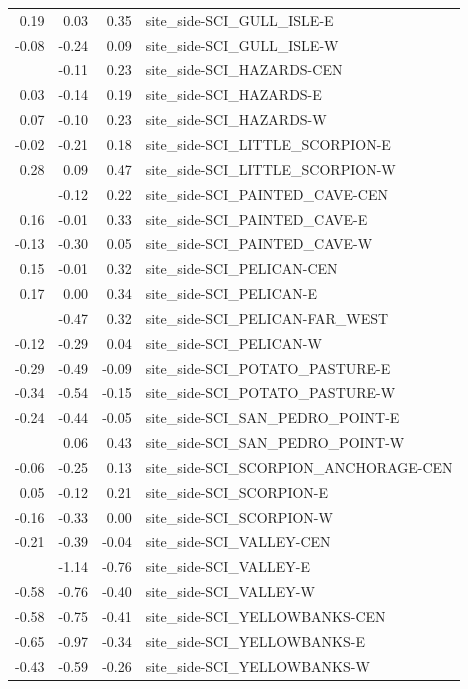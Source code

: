 \documentclass[]{article}
\begin{document}
\begin{longtable}[t]{rrrl}
0.19 & 0.03 & 0.35 & site\_side-SCI\_GULL\_ISLE-E\\
-0.08 & -0.24 & 0.09 & site\_side-SCI\_GULL\_ISLE-W\\
\addlinespace
0.06 & -0.11 & 0.23 & site\_side-SCI\_HAZARDS-CEN\\
0.03 & -0.14 & 0.19 & site\_side-SCI\_HAZARDS-E\\
0.07 & -0.10 & 0.23 & site\_side-SCI\_HAZARDS-W\\
-0.02 & -0.21 & 0.18 & site\_side-SCI\_LITTLE\_SCORPION-E\\
0.28 & 0.09 & 0.47 & site\_side-SCI\_LITTLE\_SCORPION-W\\
\addlinespace
0.05 & -0.12 & 0.22 & site\_side-SCI\_PAINTED\_CAVE-CEN\\
0.16 & -0.01 & 0.33 & site\_side-SCI\_PAINTED\_CAVE-E\\
-0.13 & -0.30 & 0.05 & site\_side-SCI\_PAINTED\_CAVE-W\\
0.15 & -0.01 & 0.32 & site\_side-SCI\_PELICAN-CEN\\
0.17 & 0.00 & 0.34 & site\_side-SCI\_PELICAN-E\\
\addlinespace
-0.07 & -0.47 & 0.32 & site\_side-SCI\_PELICAN-FAR\_WEST\\
-0.12 & -0.29 & 0.04 & site\_side-SCI\_PELICAN-W\\
-0.29 & -0.49 & -0.09 & site\_side-SCI\_POTATO\_PASTURE-E\\
-0.34 & -0.54 & -0.15 & site\_side-SCI\_POTATO\_PASTURE-W\\
-0.24 & -0.44 & -0.05 & site\_side-SCI\_SAN\_PEDRO\_POINT-E\\
\addlinespace
0.25 & 0.06 & 0.43 & site\_side-SCI\_SAN\_PEDRO\_POINT-W\\
-0.06 & -0.25 & 0.13 & site\_side-SCI\_SCORPION\_ANCHORAGE-CEN\\
0.05 & -0.12 & 0.21 & site\_side-SCI\_SCORPION-E\\
-0.16 & -0.33 & 0.00 & site\_side-SCI\_SCORPION-W\\
-0.21 & -0.39 & -0.04 & site\_side-SCI\_VALLEY-CEN\\
\addlinespace
-0.95 & -1.14 & -0.76 & site\_side-SCI\_VALLEY-E\\
-0.58 & -0.76 & -0.40 & site\_side-SCI\_VALLEY-W\\
-0.58 & -0.75 & -0.41 & site\_side-SCI\_YELLOWBANKS-CEN\\
-0.65 & -0.97 & -0.34 & site\_side-SCI\_YELLOWBANKS-E\\
-0.43 & -0.59 & -0.26 & site\_side-SCI\_YELLOWBANKS-W\\

\end{longtable}
\end{document}
